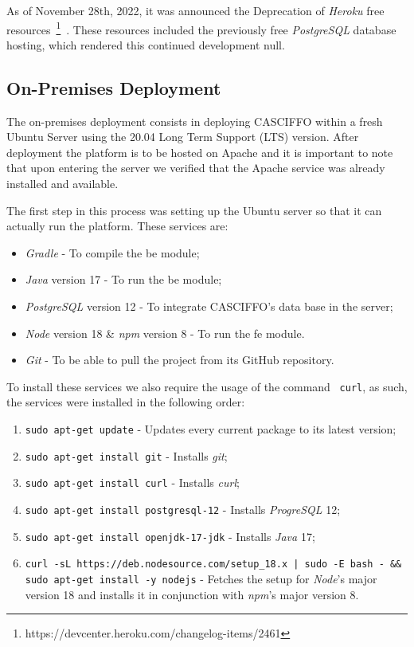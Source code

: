 As of November 28th, 2022, it was announced the Deprecation of \textit{Heroku} free resources~\footnote{https://devcenter.heroku.com/changelog-items/2461}~\label{fn:heroku-rip-free}. These resources included the previously free \textit{PostgreSQL} database hosting, which rendered this continued development null.


\subsection{On-Premises Deployment}\label{ch:impl:sec:install-deploy:ss:on-premises}


The on-premises deployment consists in deploying CASCIFFO within a fresh Ubuntu Server using the 20.04 Long Term Support (LTS) version. After deployment the platform is to be hosted on Apache and it is important to note that upon entering the server we verified that the Apache service was already installed and available. 

The first step in this process was setting up the Ubuntu server so that it can actually run the platform.
These services are:
\begin{itemize}
    \item \textit{Gradle} - To compile the \acrshort{be} module;
    \item \textit{Java} version 17 - To run the \acrshort{be} module;
    \item \textit{PostgreSQL} version 12 - To integrate CASCIFFO's data base in the server;
    \item \textit{Node} version 18 \& \textit{npm} version 8 - To run the \acrshort{fe} module.
    \item \textit{Git} - To be able to pull the project from its GitHub repository.
\end{itemize}

To install these services we also require the usage of the command ~\lstinline{curl}, as such, the services were installed in the following order:

\begin{enumerate}
    \item \lstinline{sudo apt-get update} - Updates every current package to its latest version;
    \item \lstinline{sudo apt-get install git} - Installs \textit{git};
    \item \lstinline{sudo apt-get install curl} - Installs \textit{curl};
    \item \lstinline{sudo apt-get install postgresql-12} - Installs \textit{ProgreSQL} 12;
    \item \lstinline{sudo apt-get install openjdk-17-jdk} - Installs \textit{Java} 17;
    \item \lstinline{curl -sL https://deb.nodesource.com/setup_18.x | sudo -E bash - && sudo apt-get install -y nodejs} - Fetches the setup for \textit{Node}'s major version 18 and installs it in conjunction with \textit{npm}'s major version 8.
\end{enumerate}

